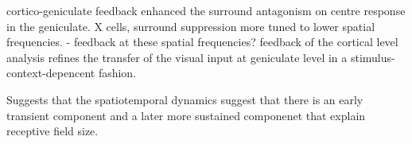 \documentclass {report}
\begin{document}
\cite{Cudeiro1996} cortico-geniculate feedback enhanced the surround antagonism on centre response in the geniculate. X cells, surround suppression more tuned to lower spatial frequencies. - feedback at these spatial frequencies? feedback of the cortical level analysis refines the transfer of the visual input at geniculate level in a stimulus-context-depencent fashion.

\cite{Einevoll2011} Suggests that the spatiotemporal dynamics suggest that there is an early transient component and a later more sustained componenet that explain receptive field size.



\end{document}
